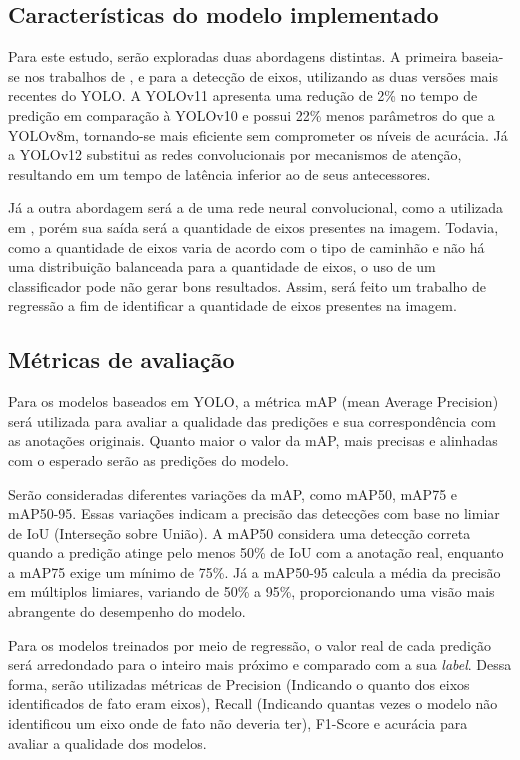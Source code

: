 \documentclass[12pt]{article}
\begin{document}
    \subsection{Características do modelo implementado}
        Para este estudo, serão exploradas duas abordagens distintas. A primeira baseia-se nos trabalhos de \cite{Souza2024}, \cite{marcomini2023truckaxledetectionconvolutional} e \cite{Miles2022} para a detecção de eixos, utilizando as duas versões mais recentes do YOLO. A YOLOv11 \cite{khanam2024yolov11overviewkeyarchitectural} apresenta uma redução de 2\% no tempo de predição em comparação à YOLOv10 e possui 22\% menos parâmetros do que a YOLOv8m, tornando-se mais eficiente sem comprometer os níveis de acurácia. Já a YOLOv12 \cite{tian2025yolov12attentioncentricrealtimeobject} substitui as redes convolucionais por mecanismos de atenção, resultando em um tempo de latência inferior ao de seus antecessores.

        Já a outra abordagem será a de uma rede neural convolucional, como a utilizada em \cite{Almutairi2022}, porém sua saída será a quantidade de eixos presentes na imagem. Todavia, como a quantidade de eixos varia de acordo com o tipo de caminhão e não há uma distribuição balanceada para a quantidade de eixos, o uso de um classificador pode não gerar bons resultados. Assim, será feito um trabalho de regressão a fim de identificar a quantidade de eixos presentes na imagem.

    \subsection{Métricas de avaliação}
        Para os modelos baseados em YOLO, a métrica mAP (mean Average Precision) será utilizada para avaliar a qualidade das predições e sua correspondência com as anotações originais. Quanto maior o valor da mAP, mais precisas e alinhadas com o esperado serão as predições do modelo.
        
        Serão consideradas diferentes variações da mAP, como mAP50, mAP75 e mAP50-95. Essas variações indicam a precisão das detecções com base no limiar de IoU (Interseção sobre União). A mAP50 considera uma detecção correta quando a predição atinge pelo menos 50\% de IoU com a anotação real, enquanto a mAP75 exige um mínimo de 75\%. Já a mAP50-95 calcula a média da precisão em múltiplos limiares, variando de 50\% a 95\%, proporcionando uma visão mais abrangente do desempenho do modelo.

        Para os modelos treinados por meio de regressão, o valor real de cada predição será arredondado para o inteiro mais próximo e comparado com a sua \textit{label}. Dessa forma, serão utilizadas métricas de Precision (Indicando o quanto dos eixos identificados de fato eram eixos), Recall (Indicando quantas vezes o modelo não identificou um eixo onde de fato não deveria ter), F1-Score e acurácia para avaliar a qualidade dos modelos. 
        
\end{document}
